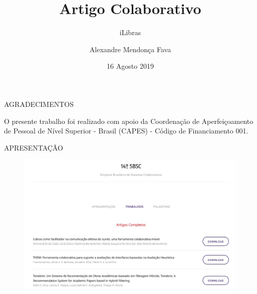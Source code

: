 \documentclass{Alexandre}
\title{Artigo Colaborativo}
\subtitle{iLibras}
\author{Alexandre Mendonça Fava\inst{1}}
\institute[UDESC]{
  \newline \newline \newline
  \inst{1}
  Mestrado Acadêmico em Computação Aplicada - PPGCA
}
\date{16 Agosto 2019}
\begin{document}
\begin{frame}
  \titlepage
\end{frame}


\begin{frame}{AGRADECIMENTOS}

    O presente trabalho foi realizado com apoio da Coordenação de Aperfeiçoamento de Pessoal de Nível Superior - Brasil (CAPES) - Código de Financiamento 001. 

\end{frame}


\begin{frame}{APRESENTAÇÃO}

    \begin{figure}
        \includegraphics[scale = 0.4]{Figuras/ArtigoSBSC14.jpg}
    \end{figure}

\end{frame}
\end{document}
